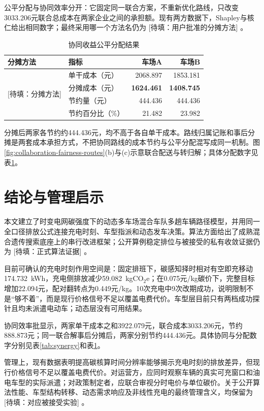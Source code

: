 \documentclass[UTF8]{setp-new}
\DeclareRobustCommand{\TBD}[1]{%
  \begingroup\setlength{\fboxsep}{1.2pt}%
  \colorbox{black!12}{\textcolor{black!65}{\textsf{\footnotesize[待填：#1]}}}%
  \endgroup}
\begin{document}
公平分配与协同效率分开：它固定同一联合方案，不重新优化路线，只改变3033.206元联合总成本在两家企业之间的承担额。现有两方数据下，Shapley与核仁给出相同数字；最终采用哪一个方法名仍为\TBD{用户批准的分摊方法}。

\begin{table}[htbp]
  \centering
  \caption{协同收益公平分配结果}
  \label{tab:allocation}
  \small
  \begin{tabular}{llrr}
    \toprule
    分摊方法 & 指标 & 车场A & 车场B\\
    \midrule
    \multirow{4}{*}{\TBD{分摊方法}} & 单干成本（元） & 2068.897 & 1853.181\\
      & 分摊成本（元） & \textbf{1624.461} & \textbf{1408.745}\\
      & 节约量（元） & 444.436 & 444.436\\
      & 节约百分比（\%） & 21.482 & 23.982\\
    \bottomrule
  \end{tabular}
\end{table}

分摊后两家各节约约444.436元，均不高于各自单干成本。路线归属记账和事后分摊是两套成本承担方式，不把协同路线的成本节约与公平分配混写成同一机制。图\ref{fig:collaboration-fairness-routes}(b)与(c)示意联合配送与转归解；具体分配数字见表\ref{tab:allocation}。

\section{结论与管理启示}

本文建立了时变电网碳强度下的动态多车场混合车队多趟车辆路径模型，并用同一全口径排放公式连接充电时刻、车型指派和动态发车决策。算法方面给出了成熟混合遗传搜索底座上的串行改进框架；公开算例稳定排位与被接受的私有收敛证据仍为\TBD{正式算法证据}。

目前可确认的充电时刻作用空间是：固定排班下，碳感知择时相对有空即充移动174.732~kWh，充电侧排放减少59.082~kgCO$_2$e；在0.075元/kg碳价下，完整目标增加22.094元，配对翻转点为0.449元/kg。10次充电中9次改期成功，说明限制不是“够不着”，而是现行价格信号不足以覆盖电费代价。车型层目前只有两档成功探针且均未派遣电动车；动态层没有可用结果。

协同效率批显示，两家单干成本之和3922.079元，联合成本3033.206元，节约888.873元；同一联合解事后分摊后，两家分别节约444.436元。具体协同与分配数字分别见表\ref{tab:synergy}和表\ref{tab:allocation}。

管理上，现有数据表明提高碳核算时间分辨率能够揭示充电时刻的排放差异，但现行价格信号不足以覆盖电费代价。对运营方，应同时观察车辆的真实可充窗口和油电车型的实际派遣；对政策制定者，应联合审视分时电价与单位碳价。关于公开算法性能、车型结构转移、动态需求响应及非线性充电的最终管理含义，均保留为\TBD{对应被接受实验}。
\end{document}
